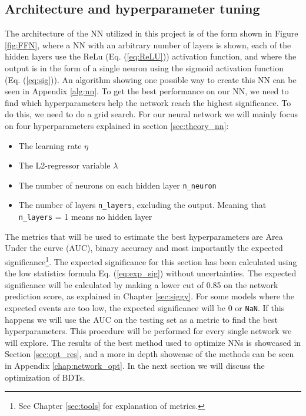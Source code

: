 \documentclass[12pt, a4paper]{book}
\begin{document}
\subsection{Architecture and hyperparameter tuning}\label{sec:NNgriddy}
The architecture of the NN utilized in this project is of the form shown in Figure \ref{fig:FFN}, where a NN with an arbitrary number of layers is shown, each of the hidden layers use the ReLu (Eq. (\ref{eq:ReLU})) activation function, and where the output is in the form of a single neuron using the sigmoid activation function (Eq. (\ref{eq:sig})). 
An algorithm showing one possible way to create this NN can be seen in Appendix \ref{alg:nn}. To get the best performance on our NN, we need to find which hyperparameters help the network reach the highest significance. To do this, we need to do a grid search. 
For our neural network we will mainly focus on four hyperparameters explained in section \ref{sec:theory_nn}:
\begin{itemize}
   \item The learning rate $\eta$
   \item The L2-regressor variable $\lambda$
   \item The number of neurons on each hidden layer \verb|n_neuron|
   \item The number of layers \verb|n_layers|, excluding the output. Meaning that \verb|n_layers| = 1 means no hidden layer
\end{itemize}
The metrics that will be used to estimate the best hyperparameters are Area Under the curve (AUC), binary accuracy and most importantly the expected significance\footnote{See Chapter \ref{sec:tools} for explanation of metrics.}.
The expected significance for this section has been calculated using the low statistics formula Eq. (\ref{eq:exp_sig}) without uncertainties. The expected significance will be calculated by making a lower cut of 0.85 on the network prediction score, as explained in Chapter \ref{sec:siggy}. 
For some models where the expected events are too low, the expected significance will be 0 or \verb|NaN|. If this happens we will use the AUC on the testing set as a metric to find the best hyperparameters. 
This procedure will be performed for every single network we will explore. The results of the best method used to optimize NNs is showcased in Section \ref{sec:opt_res}, and a more in depth showcase of the methods can be seen in Appendix \ref{chap:network_opt}. In the next section we will discuss the optimization of BDTs. 
\clearpage
\end{document}
